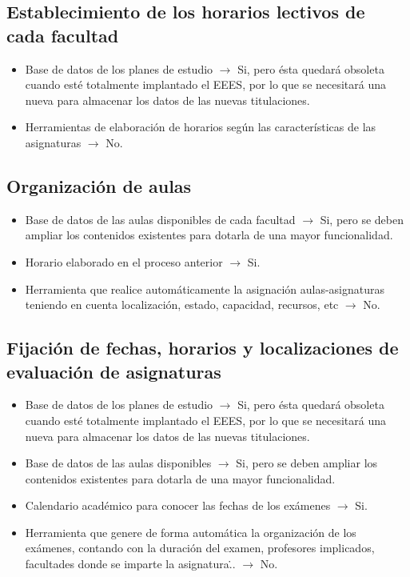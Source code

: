 \documentclass[11pt,a4paper,spanish,twoside]{book}
\begin{document}
\begin{itemize}
\subsection{Establecimiento de los horarios lectivos de cada facultad}
\begin{itemize}
\item Base de datos de los planes de estudio $\to$ Si, pero ésta quedará obsoleta cuando esté totalmente implantado el EEES, por lo que se necesitará una nueva para almacenar los datos de las nuevas titulaciones.
\item Herramientas de elaboración de horarios según las características de las asignaturas $\to$ No.
\end{itemize}

\subsection{Organización de aulas}
\begin{itemize}
\item Base de datos de las aulas disponibles de cada facultad $\to$ Si, pero se deben ampliar los contenidos existentes para dotarla de una mayor funcionalidad.
\item Horario elaborado en el proceso anterior $\to$ Si.
\item  Herramienta que realice automáticamente la asignación
    aulas-asignaturas teniendo en cuenta localización, estado, capacidad,
    recursos, etc $\to$ No.
\end{itemize}

\subsection{Fijación de fechas, horarios y localizaciones de evaluación de asignaturas}
\begin{itemize}
\item Base de datos de los planes de estudio $\to$ Si, pero ésta quedará obsoleta cuando esté totalmente implantado el EEES, por lo que se necesitará una nueva para almacenar los datos de las nuevas titulaciones. 
\item Base de datos de las aulas disponibles $\to$ Si, pero se deben ampliar los contenidos existentes para dotarla de una mayor funcionalidad. 
\item Calendario académico para conocer las fechas de los exámenes $\to$ Si.
\item Herramienta que genere de forma automática la organización de los
    exámenes, contando con la duración del examen, profesores implicados,
    facultades donde se imparte la asignatura\... $\to$ No.
\end{itemize}


\end{itemize}
\end{document}
